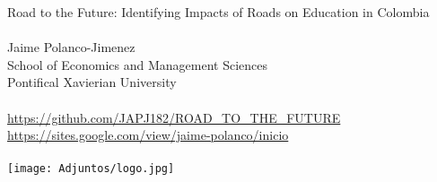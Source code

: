 \documentclass[9pt]{beamer}
\begin{document}
\begin{frame}
\centering
Road to the Future: Identifying Impacts of Roads
on Education in Colombia\\~\\

        Jaime Polanco-Jimenez \\
        
        \small  School of Economics and Management Sciences\\
        Pontifical Xavierian University\\~\\
        
        \footnotesize      \url{https://github.com/JAPJ182/ROAD_TO_THE_FUTURE}\\
        \url{https://sites.google.com/view/jaime-polanco/inicio} \\~\\
        
    \texttt{[image: Adjuntos/logo.jpg]}
\end{frame}
\end{document}
